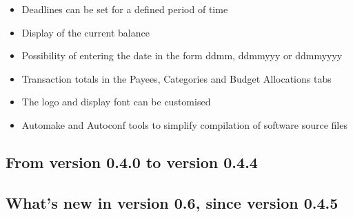 \begin{itemize}
	\item Deadlines can be set for a defined period of time%
	\item Display of the current balance%
	\item Possibility of entering the date in the form ddmm, ddmmyyy or ddmmyyyy%
	\item Transaction totals in the Payees, Categories and Budget Allocations tabs%
	\item The logo and display font can be customised%
	\item Automake and Autoconf tools to simplify compilation of software source files%
\end{itemize}

\subsection{From version 0.4.0 to version 0.4.4}

\subsection{What's new in version 0.6, since version 0.4.5}

